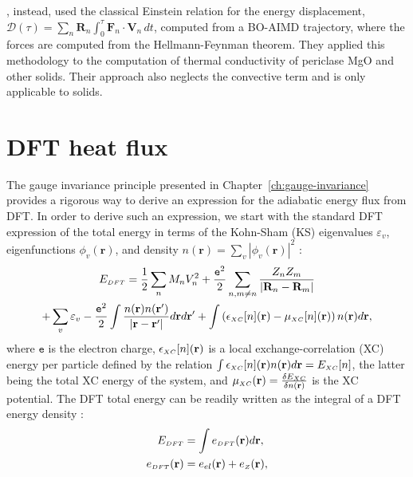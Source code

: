 \citet{English2017}, instead, used the classical Einstein relation for the energy displacement, $\mathcal{D}(\tau) = \sum_n \mathbf{R}_n \int_0^\tau \mathbf{F}_n \cdot \mathbf{V}_n \, dt$, computed from a BO-AIMD trajectory, where the forces are computed from the Hellmann-Feynman theorem. They applied this methodology to the computation of thermal conductivity of periclase MgO \cite{Tse2018} and other solids. Their approach also neglects the convective term and is only applicable to solids.


\section{DFT heat flux}  \label{sec:dft-heat-theory}
The gauge invariance principle presented in Chapter~\ref{ch:gauge-invariance} provides a rigorous way to derive an expression for the adiabatic energy flux from DFT.
In order to derive such an expression, we start with the standard DFT expression of the total energy in terms of the Kohn-Sham (KS) eigenvalues $\varepsilon_v$, eigenfunctions $\phi_v(\mathbf{r})$, and density $n(\mathbf{r}) = \sum_v |\phi_v(\mathbf{r})|^2$ \citep{Martin2008}:
\begin{multline}
  E_{{\scriptscriptstyle DFT}} = \frac{1}{2}\sum_{n}M_{n}V_{n}^{2} + \frac{\mathtt{e}^2}{2}\sum_{n,m\ne n}\frac{ Z_{n}Z_{m}}{|\mathbf{R}_{n}-\mathbf{R}_{m}|} \\
  + \sum_{v}\varepsilon_{v}-\frac{\mathtt{e}^2}{2}\int\frac{n(\mathbf{r})n(\mathbf{r}')}{|\mathbf{r}-\mathbf{r}'|}d\mathbf{r}d\mathbf{r}'+\int\left(\epsilon_{{\scriptscriptstyle XC}}[n](\mathbf{r})-\mu_{{\scriptscriptstyle XC}}[n](\mathbf{r})\right)n(\mathbf{r})d\mathbf{r},
\end{multline}
where $\mathtt{e}$ is the electron charge, $\epsilon_{\scriptscriptstyle XC}[n](\mathbf{r})$ is a local exchange-correlation (XC) energy per particle defined by the relation $ \int \epsilon_{\scriptscriptstyle XC}[n](\mathbf{r})n(\mathbf{r}) d\mathbf{r}=E_{\scriptscriptstyle XC} [n]$, the latter being the total XC energy of the system, and $ \mu_{\scriptscriptstyle XC} (\mathbf{r}) = \frac{\delta E_{\scriptscriptstyle XC} }{\delta n(\mathbf{r})}$ is the XC potential. The DFT total energy can be readily written as the integral of a DFT energy density \citep{Chetty1992}:
\begin{equation}
  \begin{aligned}
    E_{\smallDFT} & =  \int e_{\smallDFT}(\mathbf{r})d\mathbf{r},\\
    e_{\smallDFT}(\mathbf{r}) & = e_{el}(\mathbf{r})+e_{\smallZ}(\mathbf{r}),
  \end{aligned}
  \label{eq:DFT-Edensity}
\end{equation}
